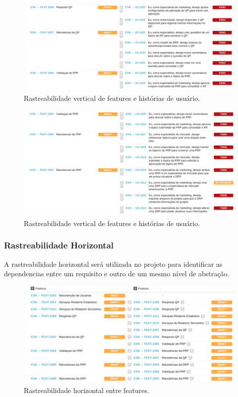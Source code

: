		\begin{figure}[!htp]
			\centering
			\includegraphics{imagens/featus2.png}
			\caption{Rastreabilidade vertical de features e histórias de usuário.}
			\label{imagem}
		\end{figure}

		\begin{figure}[!htp]
			\centering
			\includegraphics{imagens/featus3.png}
			\caption{Rastreabilidade vertical de features e histórias de usuário.}
			\label{imagem}
		\end{figure}

	\newpage
	\subsubsection{Rastreabilidade Horizontal}
	A rastreabilidade horizontal será utilizada no projeto para identificar as dependencias entre um requisito e outro de um mesmo nível de abstração.\\

		\begin{figure}[!htp]
			\centering
			\includegraphics{imagens/featfeat.png}
			\caption{Rastreabilidade horizontal entre features.}
			\label{imagem}
		\end{figure}